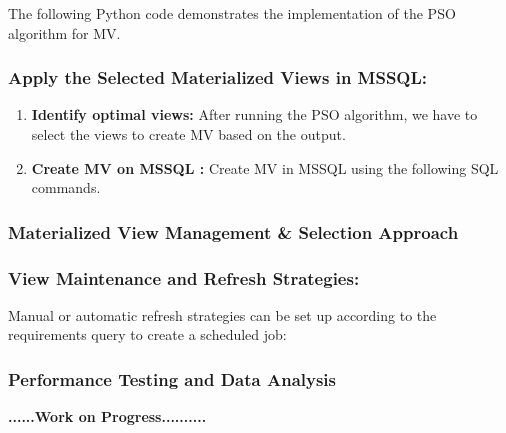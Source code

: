   The following Python code demonstrates the implementation of the PSO algorithm for MV.

  
  
\subsubsection{Apply the Selected  Materialized Views in MSSQL:}

\begin{enumerate}
    \item \textbf{Identify optimal views:} After running the PSO algorithm, we have to select the views to create MV based on the output.
    \item \textbf{ Create MV on MSSQL :} Create MV in MSSQL using the following SQL commands.
   
    
\end{enumerate}


\subsubsection{Materialized View Management \& Selection Approach}
\subsubsection{View Maintenance and Refresh Strategies:} Manual or automatic refresh strategies can be set up according to the requirements query to create a scheduled job:



\subsubsection{Performance Testing and Data Analysis}

\textbf{......\textbf{Work on Progress}..........}       